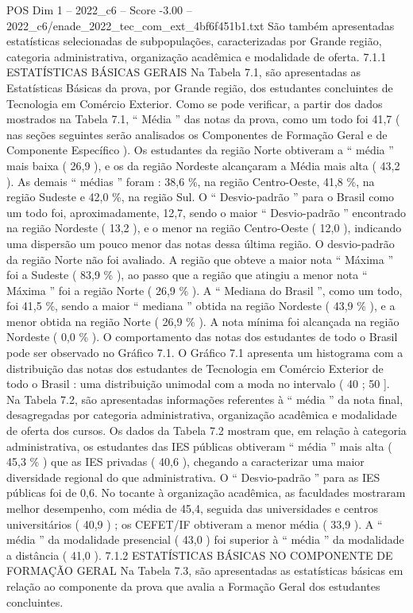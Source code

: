 \begin{textsample}{POS Dim 1 – 2022\_c6 – Score -3.00 – 2022\_c6/enade\_2022\_tec\_com\_ext\_4bf6f451b1.txt}
São também apresentadas estatísticas selecionadas de subpopulações, caracterizadas por Grande região, categoria administrativa, organização acadêmica e modalidade de oferta. 7.1.1 ESTATÍSTICAS BÁSICAS GERAIS Na Tabela 7.1, são apresentadas as Estatísticas Básicas da prova, por Grande região, dos estudantes concluintes de Tecnologia em Comércio Exterior.
Como se pode verificar, a partir dos dados mostrados na Tabela 7.1, “ Média ” das notas da prova, como um todo foi 41,7 ( nas seções seguintes serão analisados os Componentes de Formação Geral e de Componente Específico ).
Os estudantes da região Norte obtiveram a “ média ” mais baixa ( 26,9 ), e os da região Nordeste alcançaram a Média mais alta ( 43,2 ).
As demais “ médias ” foram : 38,6 \%, na região Centro-Oeste, 41,8 \%, na região Sudeste e 42,0 \%, na região Sul.
O “ Desvio-padrão ” para o Brasil como um todo foi, aproximadamente, 12,7, sendo o maior “ Desvio-padrão ” encontrado na região Nordeste ( 13,2 ), e o menor na região Centro-Oeste ( 12,0 ), indicando uma dispersão um pouco menor das notas dessa última região.
O desvio-padrão da região Norte não foi avaliado.
A região que obteve a maior nota “ Máxima ” foi a Sudeste ( 83,9 \% ), ao passo que a região que atingiu a menor nota “ Máxima ” foi a região Norte ( 26,9 \% ).
A “ Mediana do Brasil ”, como um todo, foi 41,5 \%, sendo a maior “ mediana ” obtida na região Nordeste ( 43,9 \% ), e a menor obtida na região Norte ( 26,9 \% ).
A nota mínima foi alcançada na região Nordeste ( 0,0 \% ).
O comportamento das notas dos estudantes de todo o Brasil pode ser observado no Gráfico 7.1.
O Gráfico 7.1 apresenta um histograma com a distribuição das notas dos estudantes de Tecnologia em Comércio Exterior de todo o Brasil : uma distribuição unimodal com a moda no intervalo ( 40 ; 50 ].
Na Tabela 7.2, são apresentadas informações referentes à “ média ” da nota final, desagregadas por categoria administrativa, organização acadêmica e modalidade de oferta dos cursos.
Os dados da Tabela 7.2 mostram que, em relação à categoria administrativa, os estudantes das IES públicas obtiveram “ média ” mais alta ( 45,3 \% ) que as IES privadas ( 40,6 ), chegando a caracterizar uma maior diversidade regional do que administrativa.
O “ Desvio-padrão ” para as IES públicas foi de 0,6.
No tocante à organização acadêmica, as faculdades mostraram melhor desempenho, com média de 45,4, seguida das universidades e centros universitários ( 40,9 ) ; os CEFET/IF obtiveram a menor média ( 33,9 ).
A “ média ” da modalidade presencial ( 43,0 ) foi superior à “ média ” da modalidade a distância ( 41,0 ). 7.1.2 ESTATÍSTICAS BÁSICAS NO COMPONENTE DE FORMAÇÃO GERAL Na Tabela 7.3, são apresentadas as estatísticas básicas em relação ao componente da prova que avalia a Formação Geral dos estudantes concluintes.

\end{textsample}
